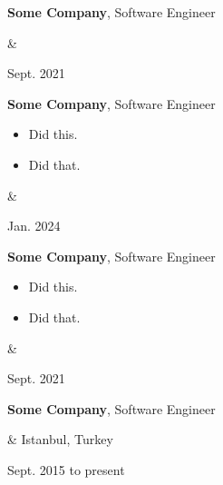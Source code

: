 \documentclass[10pt, letterpaper]{article}
\newenvironment{highlights}{
        \begin{itemize}[
                topsep=0pt,
                parsep=0.10 cm,
                partopsep=0pt,
                itemsep=0pt,
                after=\vspace{-1\baselineskip},
                leftmargin=0.4 cm + 3pt
            ]
    }{
        \end{itemize}
    } %
\let\originalTabularx\tabularx
\let\originalEndTabularx\endtabularx
\renewenvironment{tabularx}{\bgroup\centering\originalTabularx}{\originalEndTabularx\par\egroup}
\begin{document}
        \vspace{0.2 cm}
        \begin{tabularx}{
            \textwidth-0.4 cm-0.13cm
        }{
            K{0.2 cm}
            R{4.1 cm}
        }
            \textbf{Some Company}, Software Engineer

            \vspace{0.10 cm}

            &
            

            Sept. 2021
        \end{tabularx}

        \vspace{0.2 cm}
        \begin{tabularx}{
            \textwidth-0.4 cm-0.13cm
        }{
            K{0.2 cm}
            R{4.1 cm}
        }
            \textbf{Some Company}, Software Engineer

            \vspace{0.10 cm}

            \begin{highlights}
                \item Did this.
                \item Did that.
            \end{highlights}
            &
            

            Jan. 2024
        \end{tabularx}

        \vspace{0.2 cm}
        \begin{tabularx}{
            \textwidth-0.4 cm-0.13cm
        }{
            K{0.2 cm}
            R{4.1 cm}
        }
            \textbf{Some Company}, Software Engineer

            \vspace{0.10 cm}

            \begin{highlights}
                \item Did this.
                \item Did that.
            \end{highlights}
            &
            

            Sept. 2021
        \end{tabularx}

        \vspace{0.2 cm}
        \begin{tabularx}{
            \textwidth-0.4 cm-0.13cm
        }{
            K{0.2 cm}
            R{4.1 cm}
        }
            \textbf{Some Company}, Software Engineer

            \vspace{0.10 cm}

            &
            Istanbul, Turkey

            Sept. 2015 to present
        \end{tabularx}
\end{document}
